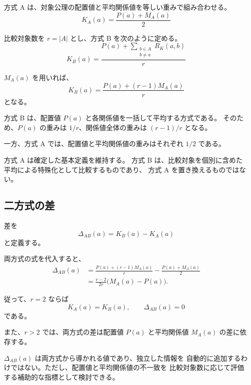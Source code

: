 \documentclass[a4paper,11pt]{ltjsarticle}
\begin{document}
方式 A は、対象公理の配置値と平均関係値を等しい重みで組み合わせる。
\begin{equation}
  K_A(a)=\frac{P(a)+M_A(a)}{2}
\end{equation}

比較対象数を $r=|A|$ とし、方式 B を次のように定める。
\begin{equation}
  \boxed{
  K_B(a)
  =
  \frac{
    P(a)+\displaystyle\sum_{\substack{b\in A\\b\ne a}}R_K(a,b)
  }{r}
  }
\end{equation}

$M_A(a)$ を用いれば、
\begin{equation}
  K_B(a)
  =
  \frac{P(a)+(r-1)M_A(a)}{r}
\end{equation}
となる。

方式 B は、配置値 $P(a)$ と各関係値を一括して平均する方式である。
そのため、$P(a)$ の重みは $1/r$、関係値全体の重みは
$(r-1)/r$ となる。

一方、方式 A では、配置値と平均関係値の重みはそれぞれ $1/2$ である。

方式 A は確定した基本定義を維持する。
方式 B は、比較対象を個別に含めた平均による特殊化として比較するものであり、
方式 A を置き換えるものではない。

\subsection{二方式の差}

差を
\begin{equation}
  \Delta_{AB}(a)=K_B(a)-K_A(a)
\end{equation}
と定義する。

両方式の式を代入すると、
\begin{align}
  \Delta_{AB}(a)
  &=
  \frac{P(a)+(r-1)M_A(a)}{r}
  -\frac{P(a)+M_A(a)}{2}\\
  &=
  \boxed{
  \frac{r-2}{2r}
  \bigl(M_A(a)-P(a)\bigr)
  }.
\end{align}

従って、$r=2$ ならば
\begin{equation}
  K_A(a)=K_B(a),\qquad \Delta_{AB}(a)=0
\end{equation}
である。

また、$r>2$ では、両方式の差は配置値 $P(a)$ と平均関係値
$M_A(a)$ の差に依存する。

$\Delta_{AB}(a)$ は両方式から導かれる値であり、独立した情報を
自動的に追加するわけではない。ただし、配置値と平均関係値の不一致を
比較対象数に応じて評価する補助的な指標として検討できる。
\end{document}
